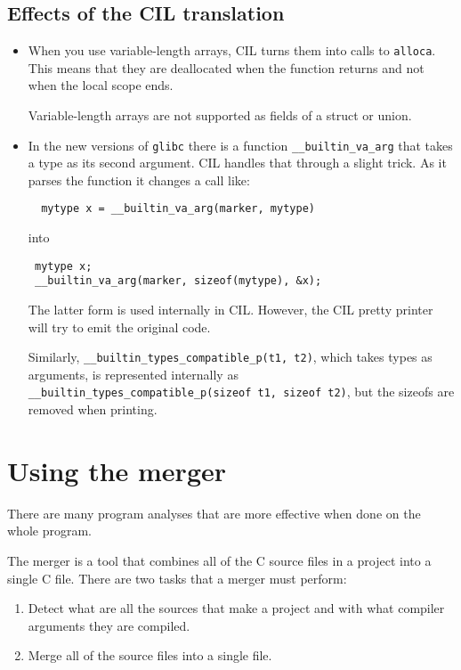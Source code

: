\documentclass{article}
\def\t#1{{\tt #1}}
\begin{document}
\subsection{Effects of the CIL translation}
\begin{itemize}
\item When you use variable-length arrays, CIL turns them into
calls to \t{alloca}. This means that they are deallocated when the function
returns and not when the local scope ends. 

Variable-length arrays are not supported as fields of a struct or union.

\item In the new versions of \t{glibc} there is a function
  \t{\_\_builtin\_va\_arg} that takes a type as its second argument. CIL
  handles that through a slight trick. As it parses the function it changes a
  call like:
\begin{verbatim}
  mytype x = __builtin_va_arg(marker, mytype)
\end{verbatim}
 into 
\begin{verbatim}
 mytype x;
 __builtin_va_arg(marker, sizeof(mytype), &x);
\end{verbatim}

 The latter form is used internally in CIL. However, the CIL pretty printer
 will try to emit the original code. 

 Similarly, \t{\_\_builtin\_types\_compatible\_p(t1, t2)}, which takes
 types as arguments, is represented internally as
 \t{\_\_builtin\_types\_compatible\_p(sizeof t1, sizeof t2)}, but the
 sizeofs are removed when printing.

\end{itemize}





  \section{Using the merger}\label{sec-merger}

 There are many program analyses that are more effective when
done on the whole program.

 The merger is a tool that combines all of the C source files in a project
into a single C file. There are two tasks that a merger must perform:
\begin{enumerate}
\item Detect what are all the sources that make a project and with what
compiler arguments they are compiled.

\item Merge all of the source files into a single file. 
\end{enumerate}
\end{document}
